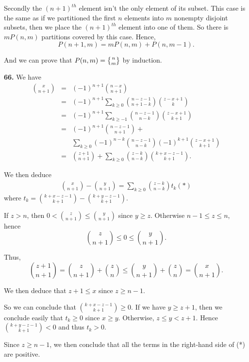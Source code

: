 \documentclass[a4paper,12pt]{article}
\newcommand{\newpar}[1]{\bigskip \noindent \textbf{#1.}}
\newcommand{\stirlingtwo}[2]{{#1 \atopwithdelims\{\}#2}}
\begin{document}
Secondly the $(n+1)^{th}$ element isn't the only element of its
subset.  This case is the same as if we partitioned the first $n$
elements into $m$ nonempty disjoint subsets, then we place the
$(n+1)^{th}$ element into one of them.  So there is $m P(n, m)$
partitions covered by this case.  Hence,
\[ P(n+1, m) = m P(n, m) + P(n, m-1).\]

And we can prove that $P(n, m) = \stirlingtwo{n}{m}$ by induction.

\newpar{66} We have
\begin{eqnarray*}
  {x \choose n+1} &=& (-1)^{n+1} {n-x \choose n+1} \\
  &=& (-1)^{n+1} \sum_{k\ge 0} {n-z-1 \choose n+1-k}{z-x+1 \choose
    k}\\ &=&
  (-1)^{n+1} \sum_{k\ge -1} {n-z-1 \choose n-k}{z-x+1 \choose k+1} \\
  &=& (-1)^{n+1} {n-z-1 \choose n+1} + \\&&\sum_{k\ge 0} (-1)^{n-k}{n-z-1
    \choose n-k}(-1)^{k+1}{z-x+1 \choose k+1} \\
  &=& {z+1 \choose n+1} + \sum_{k\ge 0} {z-k \choose n-k}{k+x-z-1
    \choose k+1}.
\end{eqnarray*}

We then deduce
\begin{eqnarray*}
  {x \choose n+1} - {y \choose n+1} = \sum_{k\ge 0} {z-k \choose n-k}
  t_k (*)
\end{eqnarray*}
where $t_k = {k+x-z-1 \choose k+1} - {k+y-z-1 \choose k+1}$.

If $z > n$, then $0 < {z \choose n+1} \le {y \choose n+1}$ since $y
\ge z$.  Otherwise $n-1 \le z \le n$, hence
\[ {z \choose n+1} \le 0 \le {y \choose n+1}.\]

Thus,
\[ {z+1 \choose n+1} = {z \choose n+1} + {z \choose n} \le {y \choose
  n+1} + {z \choose n} = {x \choose n+1}.\]

We then deduce that $z+1 \le x$ since $z \ge n-1$.

So we can conclude that ${k+x-z-1 \choose k+1} \ge 0$.  If we have $y
\ge z+1$, then we conclude easily that $t_k \ge 0$ since $x \ge y$.
Otherwise, $z \le y < z+1$.  Hence ${k + y - z - 1\choose k+1} < 0$
and thus $t_k > 0$.

Since $z \ge n-1$, we then conclude that all the terms in the
right-hand side of (*) are positive.
\end{document}
